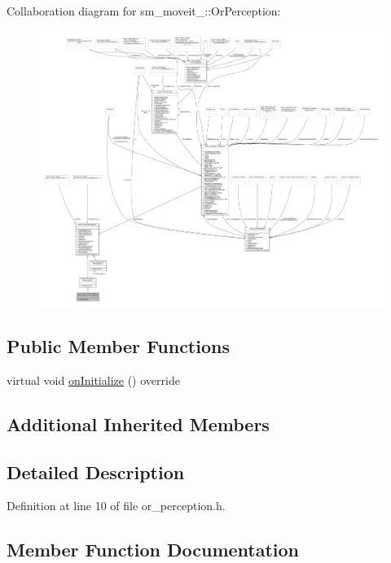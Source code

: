 Collaboration diagram for sm\+\_\+moveit\+\_\+:\+:Or\+Perception\+:
\nopagebreak
\begin{figure}[H]
\begin{center}
\leavevmode
\includegraphics[width=350pt]{classsm__moveit__2_1_1OrPerception__coll__graph}
\end{center}
\end{figure}
\subsection*{Public Member Functions}
\begin{DoxyCompactItemize}
\item 
virtual void \hyperlink{classsm__moveit__2_1_1OrPerception_a5d9c56d9fbc7dfbb2d6833a8f9f051b0}{on\+Initialize} () override
\end{DoxyCompactItemize}
\subsection*{Additional Inherited Members}


\subsection{Detailed Description}


Definition at line 10 of file or\+\_\+perception.\+h.



\subsection{Member Function Documentation}
\mbox{\label{classsm__moveit__2_1_1OrPerception_a5d9c56d9fbc7dfbb2d6833a8f9f051b0}} 
